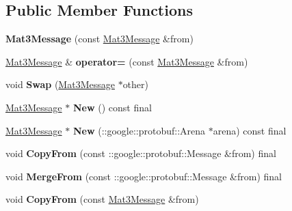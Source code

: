 \subsection*{Public Member Functions}
\begin{DoxyCompactItemize}
\item 
\mbox{\label{classtbMath_1_1Mat3Message_a3569703b75946b481947fb5cf8f90f26}} 
{\bfseries Mat3\+Message} (const \hyperlink{classtbMath_1_1Mat3Message}{Mat3\+Message} \&from)
\item 
\mbox{\label{classtbMath_1_1Mat3Message_a2c43cec528b1abea4f18fd559ee04772}} 
\hyperlink{classtbMath_1_1Mat3Message}{Mat3\+Message} \& {\bfseries operator=} (const \hyperlink{classtbMath_1_1Mat3Message}{Mat3\+Message} \&from)
\item 
\mbox{\label{classtbMath_1_1Mat3Message_a5677734a473128baf0fead590184e617}} 
void {\bfseries Swap} (\hyperlink{classtbMath_1_1Mat3Message}{Mat3\+Message} $\ast$other)
\item 
\mbox{\label{classtbMath_1_1Mat3Message_a49837bede7956aa59a58a6c6a3b8eb1e}} 
\hyperlink{classtbMath_1_1Mat3Message}{Mat3\+Message} $\ast$ {\bfseries New} () const final
\item 
\mbox{\label{classtbMath_1_1Mat3Message_a67864653f84f833aa223d0d756f02cd1}} 
\hyperlink{classtbMath_1_1Mat3Message}{Mat3\+Message} $\ast$ {\bfseries New} (\+::google\+::protobuf\+::\+Arena $\ast$arena) const final
\item 
\mbox{\label{classtbMath_1_1Mat3Message_afec12748b40e62cde27335c3d4c49eb3}} 
void {\bfseries Copy\+From} (const \+::google\+::protobuf\+::\+Message \&from) final
\item 
\mbox{\label{classtbMath_1_1Mat3Message_a74702aaa151fec0c3ac7132df80e1f53}} 
void {\bfseries Merge\+From} (const \+::google\+::protobuf\+::\+Message \&from) final
\item 
\mbox{\label{classtbMath_1_1Mat3Message_a8e8c855c7d987a7cee1a6776f3c0a426}} 
void {\bfseries Copy\+From} (const \hyperlink{classtbMath_1_1Mat3Message}{Mat3\+Message} \&from)

\end{DoxyCompactItemize}

